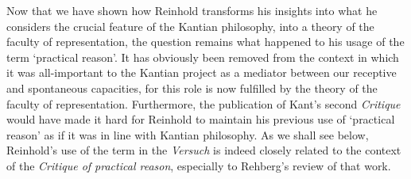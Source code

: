 Now that we have shown how Reinhold transforms his insights into what he considers the crucial feature of the Kantian philosophy, into a theory of the faculty of representation, the question remains what happened to his usage of the term `practical reason'. It has obviously been removed from the context in which it was all{-}important to the Kantian project as a mediator between our receptive and spontaneous capacities, for this role is now fulfilled by the theory of the faculty of representation. Furthermore, the publication of Kant's second \textit{Critique }would have made it hard for Reinhold to maintain his previous use of `practical reason' as if it was in line with Kantian philosophy. As we shall see below, Reinhold's use of the term in the \textit{Versuch} is indeed closely related to the context of the \textit{Critique of practical reason}, especially to Rehberg's review of that work. 

